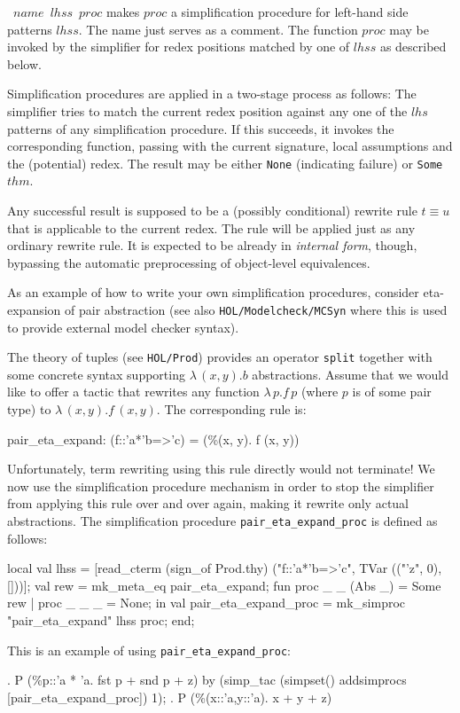 \begin{ttdescription}
\item[\ttindexbold{mk_simproc}~$name$~$lhss$~$proc$] makes $proc$ a
  simplification procedure for left-hand side patterns $lhss$.  The
  name just serves as a comment.  The function $proc$ may be invoked
  by the simplifier for redex positions matched by one of $lhss$ as
  described below.
\end{ttdescription}

Simplification procedures are applied in a two-stage process as
follows: The simplifier tries to match the current redex position
against any one of the $lhs$ patterns of any simplification procedure.
If this succeeds, it invokes the corresponding {\ML} function, passing
with the current signature, local assumptions and the (potential)
redex.  The result may be either \texttt{None} (indicating failure) or
\texttt{Some~$thm$}.

Any successful result is supposed to be a (possibly conditional)
rewrite rule $t \equiv u$ that is applicable to the current redex.
The rule will be applied just as any ordinary rewrite rule.  It is
expected to be already in \emph{internal form}, though, bypassing the
automatic preprocessing of object-level equivalences.

\medskip

As an example of how to write your own simplification procedures,
consider eta-expansion of pair abstraction (see also
\texttt{HOL/Modelcheck/MCSyn} where this is used to provide external
model checker syntax).
  
The {\HOL} theory of tuples (see \texttt{HOL/Prod}) provides an
operator \texttt{split} together with some concrete syntax supporting
$\lambda\,(x,y).b$ abstractions.  Assume that we would like to offer a
tactic that rewrites any function $\lambda\,p.f\,p$ (where $p$ is of
some pair type) to $\lambda\,(x,y).f\,(x,y)$.  The corresponding rule
is:
\begin{ttbox}
pair_eta_expand:  (f::'a*'b=>'c) = (\%(x, y). f (x, y))
\end{ttbox}
Unfortunately, term rewriting using this rule directly would not
terminate!  We now use the simplification procedure mechanism in order
to stop the simplifier from applying this rule over and over again,
making it rewrite only actual abstractions.  The simplification
procedure \texttt{pair_eta_expand_proc} is defined as follows:
\begin{ttbox}
local
  val lhss =
    [read_cterm (sign_of Prod.thy) 
                ("f::'a*'b=>'c", TVar (("'z", 0), []))];
  val rew = mk_meta_eq pair_eta_expand; \medskip
  fun proc _ _ (Abs _) = Some rew
    | proc _ _ _ = None;
in
  val pair_eta_expand_proc = mk_simproc "pair_eta_expand" lhss proc;
end;
\end{ttbox}
This is an example of using \texttt{pair_eta_expand_proc}:
\begin{ttbox}
{. P (\%p::'a * 'a. fst p + snd p + z)}
by (simp_tac (simpset() addsimprocs [pair_eta_expand_proc]) 1);
{. P (\%(x::'a,y::'a). x + y + z)}
\end{ttbox}

